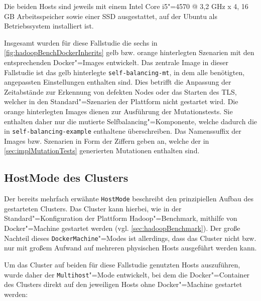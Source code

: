 Die beiden Hosts sind jeweils mit einem Intel Core i5"=4570 @ 3,2 GHz x 4, 16 GB Arbeitsspeicher sowie einer SSD ausgestattet, auf der Ubuntu als Betriebssystem installiert ist.

Insgesamt wurden für diese Fallstudie die sechs in \cref{fig:hadoopBenchDockerInherits} gelb bzw. orange hinterlegten Szenarien mit den entsprechenden Docker"=Images entwickelt.
Das zentrale Image in dieser Fallstudie ist das gelb hinterlegte \texttt{self-balancing-mt}, in dem alle benötigten, angepassten Einstellungen enthalten sind.
Dies betrifft \zB die Anpassung der Zeitabstände zur Erkennung von defekten Nodes oder das Starten des \gls{TLS}, welcher in den Standard"=Szenarien der Plattform nicht gestartet wird.
Die orange hinterlegten Images dienen zur Ausführung der  Mutationstests.
Sie enthalten daher nur die mutierte Selfbalancing"=Komponente, welche dadurch die in \texttt{self-balancing-example} enthaltene überschreiben.
Das Namenssuffix der Images bzw. Szenarien in Form der Ziffern geben an, welche der in \cref{sec:implMutationTests} generierten Mutationen enthalten sind.

\subsection{HostMode des Clusters}
\label{subsec:hostMode}

Der bereits mehrfach erwähnte \texttt{HostMode} beschreibt den prinzipiellen Aufbau des gestarteten Clusters.
Das Cluster kann hierbei, wie in der Standard"=Konfiguration der Plattform Hadoop"=Benchmark, mithilfe von Docker"=Machine gestartet werden (vgl. \cref{sec:hadoopBenchmark}).
Der große Nachteil dieses \texttt{DockerMachine}"=Modes ist allerdings, dass das Cluster nicht bzw. nur mit großem Aufwand auf mehreren physischen Hosts ausgeführt werden kann.

Um das Cluster auf beiden für diese Fallstudie genutzten Hosts auszuführen, wurde daher der \texttt{Multihost}"=Mode entwickelt, bei dem die Docker"=Container des Clusters direkt auf den jeweiligen Hosts ohne Docker"=Machine gestartet werden:

